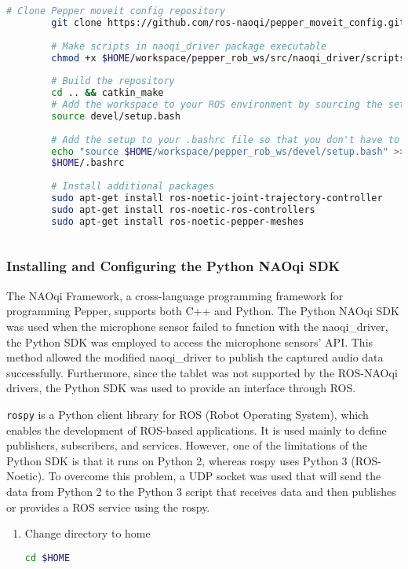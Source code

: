 \documentclass{CSSRforAfrica}
\begin{document}
{\begin{lstlisting}[style=withoutNumbering, language=bash]
		# Clone Pepper moveit config repository
		git clone https://github.com/ros-naoqi/pepper_moveit_config.git
		
		# Make scripts in naoqi_driver package executable
		chmod +x $HOME/workspace/pepper_rob_ws/src/naoqi_driver/scripts/*
		
		# Build the repository
		cd .. && catkin_make
		# Add the workspace to your ROS environment by sourcing the setup file in the devel folder
		source devel/setup.bash
		
		# Add the setup to your .bashrc file so that you don't have to do this every time you open a new terminal
		echo "source $HOME/workspace/pepper_rob_ws/devel/setup.bash" >> \
		$HOME/.bashrc
		
		# Install additional packages
		sudo apt-get install ros-noetic-joint-trajectory-controller
		sudo apt-get install ros-noetic-ros-controllers
		sudo apt-get install ros-noetic-pepper-meshes
		
		\end{lstlisting}
		\subsubsection*{Installing and Configuring the Python NAOqi SDK}
		{
			The NAOqi Framework, a cross-language programming framework for programming Pepper, supports both C++ and Python. The Python NAOqi SDK was used when the microphone sensor failed to function with the naoqi\_driver, the Python SDK was employed to access the microphone sensors' API. This method allowed the modified naoqi\_driver to publish the captured audio data successfully. Furthermore, since the tablet was not supported by the ROS-NAOqi drivers, the Python SDK was used to provide an interface through ROS. 
			
			\texttt{rospy} is a Python client library for ROS (Robot Operating System), which enables the development of ROS-based applications. It is used mainly to define publishers, subscribers, and services. However, one of the limitations of the Python SDK is that it runs on Python 2, whereas rospy uses Python 3 (ROS-Noetic). To overcome this problem, a UDP socket was used that will send the data from Python 2 to the Python 3 script that receives data and then publishes or provides a ROS service using the rospy.
			
			\begin{enumerate}
				\item Change directory to home  
				\begin{lstlisting}[style=withoutNumbering, language=bash]
				cd $HOME
				\end{lstlisting}
				

\end{enumerate}}}
\end{document}
